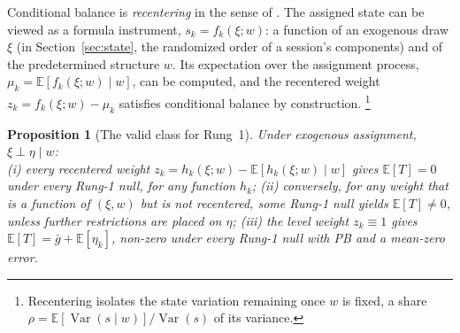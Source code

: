 \documentclass[11pt,a4paper]{article}
\theoremstyle{plain}
\newtheorem{proposition}{Proposition}
\theoremstyle{definition}
\newcommand{\E}{\mathbb{E}}
\newcommand{\Var}{\mathrm{Var}}
\begin{document}
Conditional balance is \emph{recentering} in the sense of \citet{borusyak2023}. The assigned state can be viewed as a formula instrument, $s_k=f_k(\xi;w)$: a %
function of an exogenous draw $\xi$ (in Section~\ref{sec:state}, the randomized order of a session's components) and of the predetermined structure $w$. Its expectation over the assignment process, $\mu_k=\E[f_k(\xi;w)\mid w]$, can be computed, and the recentered weight $z_k=f_k(\xi;w)-\mu_k$ satisfies conditional balance by construction.%
\footnote{Recentering isolates the state variation remaining once $w$ is fixed, a share $\rho=\mathbb{E}[\operatorname{Var}(s\mid w)]/\operatorname{Var}(s)$ of its variance.}

\begin{proposition}[The valid class for Rung~1]
\label{prop:class}
Under exogenous assignment, $\xi \perp \eta \mid w$:\\
(i) every recentered weight $z_k=h_k(\xi;w)-\E[h_k(\xi;w)\mid w]$ gives $\E[T]=0$ under every Rung-1 null, for any function $h_k$; (ii) conversely, for any weight that is a function of $(\xi,w)$ but is not recentered, some Rung-1 null yields $\E[T]\neq0$, unless further restrictions are placed on $\eta$; (iii) the level weight $z_k\equiv1$ gives $\E[T]=\bar g+\E[\eta_k]$, non-zero under every Rung-1 null with PB and a mean-zero error.
\end{proposition}
\end{document}
